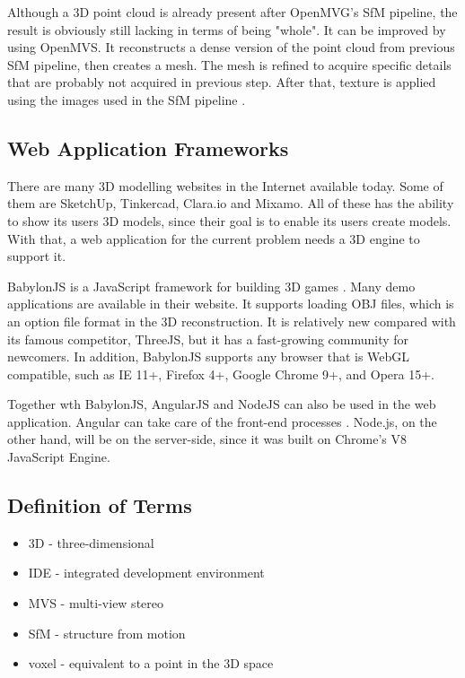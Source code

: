 \documentclass[journal]{./IEEE/IEEEtran}
\begin{document}
Although a 3D point cloud is already present after OpenMVG's SfM pipeline, the result is obviously still lacking in terms of being "whole". It can be improved by using OpenMVS. It reconstructs a dense version of the point cloud from previous SfM pipeline, then creates a mesh. The mesh is refined to acquire specific details that are probably not acquired in previous step. After that, texture is applied using the images used in the SfM pipeline \cite{OpenMVS}.

\subsection{Web Application Frameworks}
There are many 3D modelling websites in the Internet available today. Some of them are SketchUp, Tinkercad, Clara.io and Mixamo. All of these has the ability to show its users 3D models, since their goal is to enable its users create models. With that, a web application for the current problem needs a 3D engine to support it.

BabylonJS is a JavaScript framework for building 3D games \cite{Babylon}. Many demo applications are available in their website. It supports loading OBJ files, which is an option file format in the 3D reconstruction. It is relatively new compared with its famous competitor, ThreeJS, but it has a fast-growing community for newcomers. In addition, BabylonJS supports any browser that is WebGL compatible, such as IE 11+, Firefox 4+, Google Chrome 9+, and Opera 15+.

Together wth BabylonJS, AngularJS and NodeJS can also be used in the web application. Angular can take care of the front-end processes \cite{Angular}. Node.js, on the other hand, will be on the server-side, since it was built on Chrome's V8 JavaScript Engine.

\subsection{Definition of Terms}
\begin{itemize}
    \item 3D - three-dimensional
    \item IDE - integrated development environment
    \item MVS - multi-view stereo
    \item SfM - structure from motion
    \item voxel -  equivalent to a point in the 3D space
\end{itemize}
\end{document}
